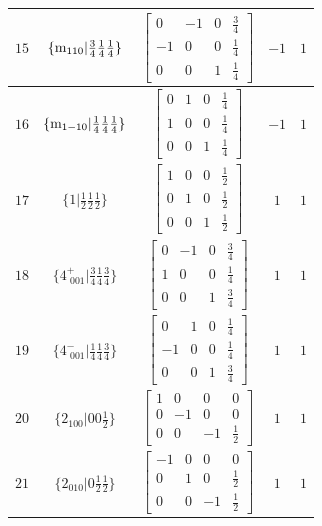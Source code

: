 \documentclass[fleqn,8pt]{jsarticle}
\begin{document}
\begin{longtable}{ccccc}
$ 15 $ & $ \{{\rm m}_{110}|\frac{3}{4} \frac{1}{4} \frac{1}{4}\} $ & $ \begin{bmatrix} 0 & -1 & 0 & \frac{3}{4} \\ -1 & 0 & 0 & \frac{1}{4} \\ 0 & 0 & 1 & \frac{1}{4} \end{bmatrix} $ & $ -1 $ & $ 1 $ \\ \hline
$ 16 $ & $ \{{\rm m}_{1-10}|\frac{1}{4} \frac{1}{4} \frac{1}{4}\} $ & $ \begin{bmatrix} 0 & 1 & 0 & \frac{1}{4} \\ 1 & 0 & 0 & \frac{1}{4} \\ 0 & 0 & 1 & \frac{1}{4} \end{bmatrix} $ & $ -1 $ & $ 1 $ \\ \hline
$ 17 $ & $ \{1|\frac{1}{2} \frac{1}{2} \frac{1}{2}\} $ & $ \begin{bmatrix} 1 & 0 & 0 & \frac{1}{2} \\ 0 & 1 & 0 & \frac{1}{2} \\ 0 & 0 & 1 & \frac{1}{2} \end{bmatrix} $ & $ 1 $ & $ 1 $ \\ \hline
$ 18 $ & $ \{4^{+}_{\,\,001}|\frac{3}{4} \frac{1}{4} \frac{3}{4}\} $ & $ \begin{bmatrix} 0 & -1 & 0 & \frac{3}{4} \\ 1 & 0 & 0 & \frac{1}{4} \\ 0 & 0 & 1 & \frac{3}{4} \end{bmatrix} $ & $ 1 $ & $ 1 $ \\ \hline
$ 19 $ & $ \{4^{-}_{\,\,001}|\frac{1}{4} \frac{1}{4} \frac{3}{4}\} $ & $ \begin{bmatrix} 0 & 1 & 0 & \frac{1}{4} \\ -1 & 0 & 0 & \frac{1}{4} \\ 0 & 0 & 1 & \frac{3}{4} \end{bmatrix} $ & $ 1 $ & $ 1 $ \\ \hline
$ 20 $ & $ \{2{}_{100}|0 0 \frac{1}{2}\} $ & $ \begin{bmatrix} 1 & 0 & 0 & 0 \\ 0 & -1 & 0 & 0 \\ 0 & 0 & -1 & \frac{1}{2} \end{bmatrix} $ & $ 1 $ & $ 1 $ \\ \hline
$ 21 $ & $ \{2{}_{010}|0 \frac{1}{2} \frac{1}{2}\} $ & $ \begin{bmatrix} -1 & 0 & 0 & 0 \\ 0 & 1 & 0 & \frac{1}{2} \\ 0 & 0 & -1 & \frac{1}{2} \end{bmatrix} $ & $ 1 $ & $ 1 $ \\ \hline

\end{longtable}
\end{document}
